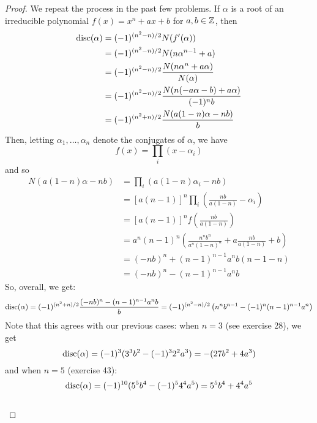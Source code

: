 \begin{proof} 
    We repeat the process in the past few problems. If $\alpha$ is a root of an irreducible polynomial $f(x) = x^n+ax+b$ for $a,b \in \mathbb{Z}$, then
    \begin{align*}
    \operatorname{disc}(\alpha)
        &= (-1)^{(n^2-n)/2}N(f'(\alpha)) \\
        &= (-1)^{(n^2-n)/2}N(n\alpha^{n-1}+a) \\
        &= (-1)^{(n^2-n)/2}\frac{N(n\alpha^n+a\alpha)}{N(\alpha)} \\
        &= (-1)^{(n^2-n)/2}\frac{N(n(-a\alpha-b)+a\alpha)}{(-1)^nb} \\
        &= (-1)^{(n^2+n)/2}\frac{N(a(1-n)\alpha-nb)}{b}
    \end{align*}
    Then, letting $\alpha_1,\ldots,\alpha_n$ denote the conjugates of $\alpha$, we have
    \[ f(x) = \prod_i (x-\alpha_i) \]
    and so
    \begin{align*}
    N(a(1-n)\alpha-nb)
        &= \prod_i (a(1-n)\alpha_i-nb) \\
        &= [a(n-1)]^n\prod_i \left(\frac{nb}{a(1-n)}-\alpha_i\right) \\
        &= [a(n-1)]^nf\left(\frac{nb}{a(1-n)}\right) \\
        &= a^n(n-1)^n\left(\frac{n^nb^n}{a^n(1-n)^n}+a\frac{nb}{a(1-n)}+b\right) \\
        &= (-nb)^n+(n-1)^{n-1}a^nb(n-1-n) \\
        &= (-nb)^n-(n-1)^{n-1}a^nb
    \end{align*}
    So, overall, we get:
    \[ \operatorname{disc}(\alpha) = (-1)^{(n^2+n)/2}\frac{(-nb)^n-(n-1)^{n-1}a^nb}{b} = (-1)^{(n^2-n)/2}\left(n^nb^{n-1} - (-1)^n(n-1)^{n-1}a^n\right) \]
    Note that this agrees with our previous cases: when $n=3$ (see exercise 28), we get
    \[ \operatorname{disc}(\alpha) = (-1)^3(3^3b^2-(-1)^32^2a^3) = -(27b^2+4a^3) \]
    and when $n=5$ (exercise 43):
    \[ \operatorname{disc}(\alpha) = (-1)^{10}(5^5b^4-(-1)^54^4a^5) = 5^5b^4+4^4a^5 \] \\


\end{proof}
